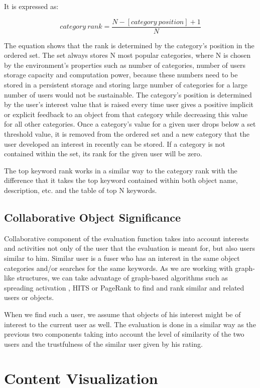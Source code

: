 \documentclass[6pt]{article}
\begin{document}
It is expressed as:

$$category~rank=\frac{N-[category~position]+1}{N}$$


The equation shows that the rank is determined by the category’s position in the ordered set. The set always stores N most popular categories, where N is chosen by the environment’s properties such as number of categories, number of users storage capacity and computation power, because these numbers need to be stored in a persistent storage and storing large number of categories for a large number of users would not be sustainable. The category’s position is determined by the user’s interest value that is raised every time user gives a positive implicit or explicit feedback to an object from that category while decreasing this value for all other categories. Once a category’s value for a given user drops below a set threshold value, it is removed from the ordered set and a new category that the user developed an interest in recently can be stored. If a category is not contained within the set, its rank for the given user will be zero.

The top keyword rank works in a similar way to the category rank with the difference that it takes the top keyword contained within both object name, description, etc. and the table of top N keywords.

\subsection{Collaborative Object Significance}

Collaborative component of the evaluation function takes into account interests and activities not only of the user that the evaluation is meant for, but also users similar to him. Similar user is a fuser who has an interest in the same object categories and/or searches for the same keywords. As we are working with graph-like structures, we can take advantage of graph-based algorithms such as spreading activation \cite{berthold2008supporting}, HITS \cite{mining2006exploring} or PageRank \cite{page1999pagerank} to find and rank similar and related users or objects.

When we find such a user, we assume that objects of his interest might be of interest to the current user as well. The evaluation is done in a similar way as the previous two components taking into account the level of similarity of the two users and the trustfulness of the similar user given by his rating.

\section{Content Visualization}
\label{3}
\end{document}
